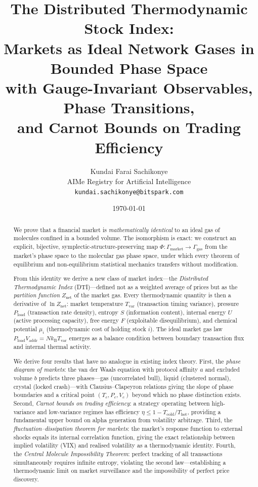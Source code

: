\documentclass[twocolumn,10pt]{article}
\title{The Distributed Thermodynamic Stock Index:\\
Markets as Ideal Network Gases in Bounded Phase Space\\
with Gauge-Invariant Observables, Phase Transitions,\\
and Carnot Bounds on Trading Efficiency}
\author{
    Kundai Farai Sachikonye\\
    AIMe Registry for Artificial Intelligence\\
    \texttt{kundai.sachikonye@bitspark.com}
}
\date{\today}
\theoremstyle{remark}
\newcommand{\kB}{k_{\mathrm{B}}}
\newcommand{\Tvar}{T_{\mathrm{var}}}
\newcommand{\Pload}{P_{\mathrm{load}}}
\newcommand{\Vaddr}{V_{\mathrm{addr}}}
\newcommand{\Znet}{Z_{\mathrm{net}}}
\begin{document}
\maketitle

\begin{abstract}
We prove that a financial market is \emph{mathematically identical} to an ideal gas of molecules confined in a bounded volume.  The isomorphism is exact: we construct an explicit, bijective, symplectic-structure-preserving map $\Phi : \Gamma_{\mathrm{market}} \to \Gamma_{\mathrm{gas}}$ from the market's phase space to the molecular gas phase space, under which every theorem of equilibrium and non-equilibrium statistical mechanics transfers without modification.

From this identity we derive a new class of market index---the \emph{Distributed Thermodynamic Index} (DTI)---defined not as a weighted average of prices but as the \emph{partition function} $\Znet$ of the market gas.  Every thermodynamic quantity is then a derivative of $\ln \Znet$: market temperature $\Tvar$ (transaction timing variance), pressure $\Pload$ (transaction rate density), entropy $S$ (information content), internal energy $U$ (active processing capacity), free energy $F$ (exploitable disequilibrium), and chemical potential $\mu_i$ (thermodynamic cost of holding stock $i$).  The ideal market gas law $\Pload \Vaddr = N\kB\Tvar$ emerges as a balance condition between boundary transaction flux and internal thermal activity.

We derive four results that have no analogue in existing index theory.  First, the \emph{phase diagram of markets}: the van der Waals equation with protocol affinity $a$ and excluded volume $b$ predicts three phases---gas (uncorrelated bull), liquid (clustered normal), crystal (locked crash)---with Clausius--Clapeyron relations giving the slope of phase boundaries and a critical point $(T_c, P_c, V_c)$ beyond which no phase distinction exists.  Second, \emph{Carnot bounds on trading efficiency}: a strategy operating between high-variance and low-variance regimes has efficiency $\eta \leq 1 - T_{\mathrm{cold}}/T_{\mathrm{hot}}$, providing a fundamental upper bound on alpha generation from volatility arbitrage.  Third, the \emph{fluctuation--dissipation theorem for markets}: the market's response function to external shocks equals its internal correlation function, giving the exact relationship between implied volatility (VIX) and realised volatility as a thermodynamic identity.  Fourth, the \emph{Central Molecule Impossibility Theorem}: perfect tracking of all transactions simultaneously requires infinite entropy, violating the second law---establishing a thermodynamic limit on market surveillance and the impossibility of perfect price discovery.


\end{abstract}
\end{document}
